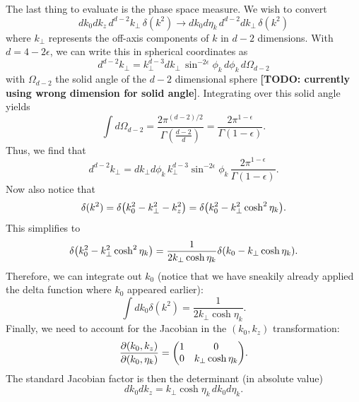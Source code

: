 \documentclass[11pt,twoside,reqno]{amsart}
\theoremstyle{plain}
\theoremstyle{remark}
\theoremstyle{definition}
\theoremstyle{remark}
\theoremstyle{definition}
\theoremstyle{definition}
\begin{document}
	The last thing to evaluate is the phase space measure. We wish to convert
	\begin{equation}
		dk_0 dk_z \,d^{d-2} k_\perp\,\delta(k^2) \to dk_0 d\eta_k\,d^{d-2}dk_\perp\,\delta(k^2)
	\end{equation}
	where $k_\perp$ represents the off-axis components of $k$ in $d-2$ dimensions. With $d = 4 - 2\epsilon$, we can write this in spherical coordinates as
	\begin{equation}
		d^{d-2}k_\perp = k_\perp^{d-3} d k_\perp\,\sin^{-2\epsilon}\phi_k\,d\phi_k \,d\Omega_{d-2}
	\end{equation}
	with $\Omega_{d-2}$ the solid angle of the $d-2$ dimensional sphere {\color{red}\textbf{[TODO: currently using wrong dimension for solid angle]}}. Integrating over this solid angle yields \cite{schwartz_quantum_2014}
	\begin{equation}
		\int d\Omega_{d-2} = \frac{2\pi^{(d-2)/2}}{\Gamma(\frac{d-2}{d})} = \frac{2\pi^{1-\epsilon}}{\Gamma(1 - \epsilon)}.
	\end{equation}
	Thus, we find that
	\begin{equation}
		d^{d-2}k_\perp = dk_\perp d\phi_k \,k_\perp^{d-3}\sin^{-2\epsilon}\phi_k\,\frac{2\pi^{1-\epsilon}}{\Gamma(1-\epsilon)}.
	\end{equation}
	Now also notice that
	\begin{equation}
		\delta(k^2) = \delta\qty(k_0^2 - k_\perp^2 - k_z^2) = \delta\qty(k_0^2 - k_\perp^2 \cosh^2\eta_k).
	\end{equation}
	This simplifies to
	\begin{equation}
		\delta\qty(k_0^2 - k_\perp^2 \cosh^2\eta_k) = \frac{1}{2k_\perp \cosh\eta_k}\delta\qty(k_0 - k_\perp \cosh\eta_k).
	\end{equation}
	Therefore, we can integrate out $k_0$ (notice that we have sneakily already applied the delta function where $k_0$ appeared earlier):
	\begin{equation}
		\int dk_0 \delta(k^2) = \frac{1}{2k_\perp \cosh\eta_k}.
	\end{equation}
	Finally, we need to account for the Jacobian in the $(k_0, k_z)$ transformation:
	\begin{equation}
		\frac{\partial(k_0, k_z)}{\partial(k_0, \eta_k)} = \mqty(
		1 & 0 \\ 
		0 & k_\perp \cosh\eta_k).
	\end{equation}
	The standard Jacobian factor is then the determinant (in absolute value)
	\begin{equation}
		dk_0 dk_z = k_\perp \cosh\eta_k \,dk_0 d\eta_k.
	\end{equation}
\end{document}
